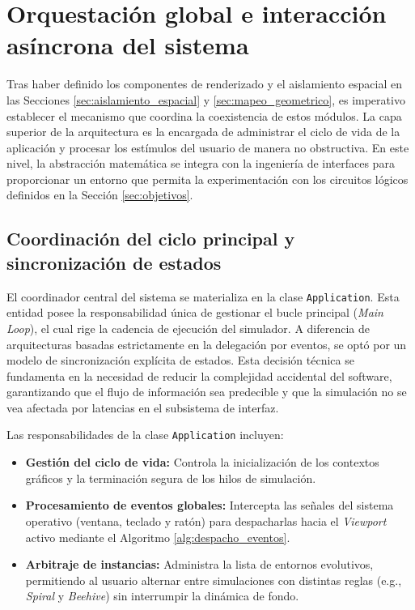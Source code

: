 \section{Orquestación global e interacción asíncrona del sistema}
\label{sec:orquestacion_global}

Tras haber definido los componentes de renderizado y el aislamiento espacial en las Secciones \ref{sec:aislamiento_espacial} y \ref{sec:mapeo_geometrico}, es imperativo establecer el mecanismo que coordina la coexistencia de estos módulos. La capa superior de la arquitectura es la encargada de administrar el ciclo de vida de la aplicación y procesar los estímulos del usuario de manera no obstructiva. En este nivel, la abstracción matemática se integra con la ingeniería de interfaces para proporcionar un entorno que permita la experimentación con los circuitos lógicos definidos en la Sección \ref{sec:objetivos}.

\subsection{Coordinación del ciclo principal y sincronización de estados}

El coordinador central del sistema se materializa en la clase \texttt{Application}. Esta entidad posee la responsabilidad única de gestionar el bucle principal (\textit{Main Loop}), el cual rige la cadencia de ejecución del simulador. A diferencia de arquitecturas basadas estrictamente en la delegación por eventos, se optó por un modelo de sincronización explícita de estados. Esta decisión técnica se fundamenta en la necesidad de reducir la complejidad accidental del software, garantizando que el flujo de información sea predecible y que la simulación no se vea afectada por latencias en el subsistema de interfaz.

Las responsabilidades de la clase \texttt{Application} incluyen:
\begin{itemize}
    \item \textbf{Gestión del ciclo de vida:} Controla la inicialización de los contextos gráficos y la terminación segura de los hilos de simulación.
    \item \textbf{Procesamiento de eventos globales:} Intercepta las señales del sistema operativo (ventana, teclado y ratón) para despacharlas hacia el \textit{Viewport} activo mediante el Algoritmo \ref{alg:despacho_eventos}.
    \item \textbf{Arbitraje de instancias:} Administra la lista de entornos evolutivos, permitiendo al usuario alternar entre simulaciones con distintas reglas (e.g., \textit{Spiral} y \textit{Beehive}) sin interrumpir la dinámica de fondo.
\end{itemize}

